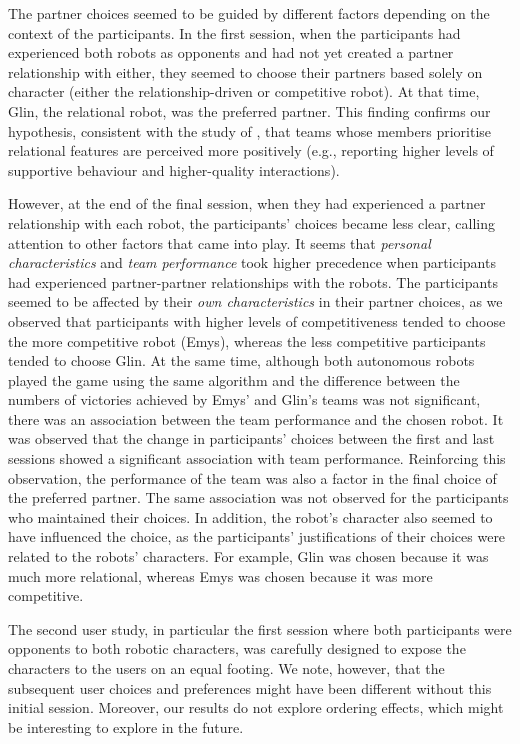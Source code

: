The partner choices seemed to be guided by different factors depending on the context of the participants. In the first session, when the participants had experienced both robots as opponents and had not yet created a partner relationship with either, they seemed to choose their partners based solely on character (either the relationship-driven or competitive robot). At that time, Glin, the relational robot, was the preferred partner. This finding confirms our hypothesis, consistent with the study of \cite{porter2005goal}, that teams whose members prioritise relational features are perceived more positively (e.g., reporting higher levels of supportive behaviour and higher-quality interactions).

However, at the end of the final session, when they had experienced a partner relationship with each robot, the participants' choices became less clear, calling attention to other factors that came into play.
It seems that \textit{personal characteristics} and \textit{team performance} took higher precedence when participants had experienced partner-partner relationships with the robots.
The participants seemed to be affected by their \textit{own characteristics} in their partner choices, as we observed that participants with higher levels of competitiveness tended to choose the more competitive robot (Emys), whereas the less competitive participants tended to choose Glin. 
At the same time, although both autonomous robots played the game using the same algorithm and the difference between the numbers of victories achieved by Emys' and Glin's teams was not significant, there was an association between the team performance and the chosen robot. It was observed that the change in participants' choices between the first and last sessions showed a significant association with team performance. Reinforcing this observation, the performance of the team was also a factor in the final choice of the preferred partner. The same association was not observed for the participants who maintained their choices.
In addition, the robot's character also seemed to have influenced the choice, as the participants' justifications of their choices were related to the robots' characters. For example, Glin was chosen because it was much more relational, whereas Emys was chosen because it was more competitive. 

The second user study, in particular the first session where both participants were opponents to both robotic characters, was carefully designed to expose the characters to the users on an equal footing. We note, however, that the subsequent user choices and preferences might have been different without this initial session. Moreover, our results do not explore ordering effects, which might be interesting to explore in the future.

